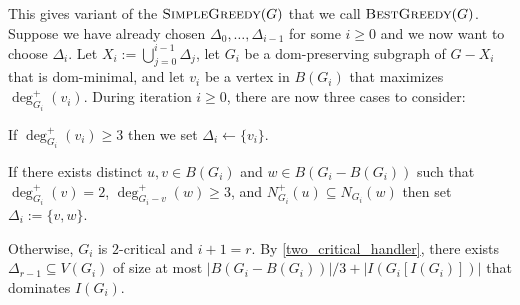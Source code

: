 \documentclass[12pt]{article}
\theoremstyle{definition}
\begin{document}
This gives variant of the $\textsc{SimpleGreedy}(G)$ that we call $\textsc{BestGreedy}(G)$.  Suppose we have already chosen $\Delta_0,\ldots,\Delta_{i-1}$ for some $i\ge 0$ and we now want to choose $\Delta_i$.  Let $X_i:=\bigcup_{j=0}^{i-1}\Delta_j$, let $G_i$ be a dom-preserving subgraph of $G-X_i$ that is dom-minimal, and let $v_i$ be a vertex in $B(G_i)$ that maximizes $\deg^+_{G_i}(v_i)$.  During iteration $i\ge 0$, there are now three cases to consider:
\begin{compactenum}
    \item If $\deg^+_{G_i}(v_i)\ge 3$ then we set $\Delta_i\gets\{v_i\}$.
    \item If there exists distinct $u,v\in B(G_i)$ and $w\in B(G_i-B(G_i))$ such that $\deg^+_{G_i}(v)=2$, $\deg^+_{G_i-v}(w)\ge 3$, and $N^+_{G_i}(u)\subseteq N_{G_i}(w)$ then set $\Delta_i:=\{v,w\}$.
    \item Otherwise, $G_i$ is $2$-critical and $i+1=r$.  By \cref{two_critical_handler}, there exists $\Delta_{r-1}\subseteq V(G_i)$ of size at most $|B(G_i-B(G_i))|/3 + |I(G_i[I(G_i)])|$ that dominates $I(G_i)$.
\end{compactenum}
\end{document}
